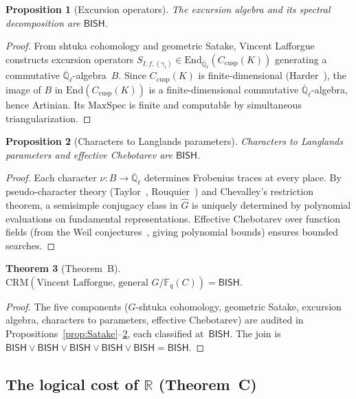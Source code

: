 \documentclass[11pt]{article}
\theoremstyle{plain}
\newtheorem{theorem}{Theorem}[section]
\newtheorem{proposition}[theorem]{Proposition}
\theoremstyle{definition}
\theoremstyle{remark}
\newcommand{\Q}{\mathbb{Q}}
\newcommand{\R}{\mathbb{R}}
\newcommand{\Fq}{\mathbb{F}_q}
\newcommand{\Qlbar}{\overline{\Q}_\ell}
\newcommand{\End}{\mathrm{End}}
\newcommand{\CRM}{\mathrm{CRM}}
\newcommand{\MaxSpec}{\mathrm{MaxSpec}}
\newcommand{\dualG}{\widehat{G}}
\newcommand{\BISH}{\mathsf{BISH}}
\begin{document}
\begin{proposition}[Excursion operators]\label{prop:excursion}
The excursion algebra and its spectral decomposition are $\BISH$.
\end{proposition}

\begin{proof}
From shtuka cohomology and geometric Satake, Vincent Lafforgue constructs
excursion operators
$S_{I,f,(\gamma_i)} \in \End_{\Qlbar}(C_{\mathrm{cusp}}(K))$ generating a
commutative $\Qlbar$-algebra~$B$. Since $C_{\mathrm{cusp}}(K)$ is
finite-dimensional (Harder~\cite{Harder74}), the image of $B$ in
$\End(C_{\mathrm{cusp}}(K))$ is a finite-dimensional commutative
$\Qlbar$-algebra, hence Artinian. Its $\MaxSpec$ is finite and computable by
simultaneous triangularization.
\end{proof}

\begin{proposition}[Characters to Langlands parameters]\label{prop:chars}
Characters to Langlands parameters and effective Chebotarev are $\BISH$.
\end{proposition}

\begin{proof}
Each character $\nu : B \to \Qlbar$ determines Frobenius traces at every
place. By pseudo-character theory
(Taylor~\cite{Taylor91}, Rouquier~\cite{Rouquier96}) and Chevalley's
restriction theorem, a semisimple conjugacy class in $\dualG$ is uniquely
determined by polynomial evaluations on fundamental representations. Effective
Chebotarev over function fields (from the Weil conjectures~\cite{Weil48},
giving polynomial bounds) ensures bounded searches.
\end{proof}

\begin{theorem}[Theorem~B]\label{thm:Vincent-main}
$\CRM(\text{Vincent Lafforgue, general } G/\Fq(C)) = \BISH$.
\end{theorem}

\begin{proof}
The five components ($G$-shtuka cohomology, geometric Satake, excursion
algebra, characters to parameters, effective Chebotarev) are audited in
Propositions~\ref{prop:Satake}--\ref{prop:chars}, each classified at~$\BISH$.
The join is $\BISH \vee \BISH \vee \BISH \vee \BISH \vee \BISH = \BISH$.
\end{proof}

\subsection{The logical cost of $\R$ (Theorem~C)}
\end{document}
